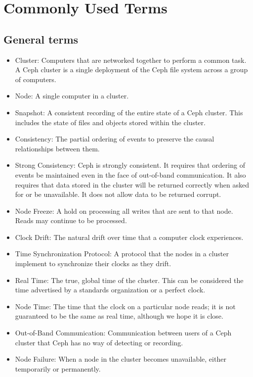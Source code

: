 \chapter{Commonly Used Terms}
\label{sec:terms}

\section{General terms}
\begin{itemize}
  \item Cluster: Computers that are networked together to perform a
    common task. A Ceph cluster is a single deployment of the Ceph
    file system across a group of computers. 
    
  \item Node: A single computer in a cluster.

  \item Snapshot: A consistent recording of the entire state of a Ceph cluster. 
  This includes the state of files and objects stored within the cluster.

  \item Consistency: The partial ordering of events to preserve the
    causal relationships between them.
    
  \item Strong Consistency: Ceph is strongly consistent. It requires 
  that ordering of events be maintained even in the face of out-of-band
  communication. It also requires that data stored in the cluster will
  be returned correctly when asked for or be unavailable. It does not 
  allow data to be returned corrupt.

  \item Node Freeze: A hold on processing all writes that are sent to
    that node. Reads may continue to be processed.

  \item Clock Drift: The natural drift over time that a computer
    clock experiences.

  \item Time Synchronization Protocol: A protocol that the nodes in
    a cluster implement to synchronize their clocks as they drift.

  \item Real Time: The true, global time of the cluster. This can be considered
  the time advertised by a standards organization or a perfect clock.

  \item Node Time: The time that the clock on a particular node reads;
    it is not guaranteed to be the same as real time, although we hope it is
    close.

  \item Out-of-Band Communication: Communication between users of a
    Ceph cluster that Ceph has no way of detecting or recording.

  \item Node Failure: When a node in the cluster
    becomes unavailable, either temporarily or permanently.
\end{itemize}

